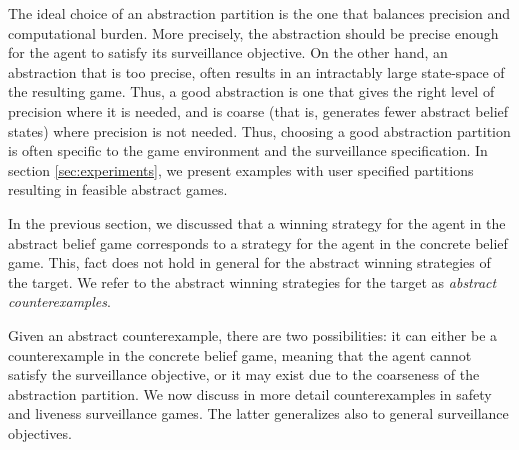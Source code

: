 The ideal choice of an abstraction partition is the one that balances precision and computational burden. More precisely, the abstraction should be precise enough for the agent to satisfy its surveillance objective. On the other hand, an abstraction that is too precise, often results in an intractably large state-space of the resulting game. Thus, a good abstraction is one that gives the right level of precision where it is needed, and is coarse (that is, generates fewer abstract belief states) where precision is not needed. Thus, choosing a good abstraction partition is often specific to the game environment and the surveillance specification. In section \ref{sec:experiments}, we present  examples with user specified partitions resulting in feasible  abstract games.

In the previous section, we discussed that a winning strategy for the agent in the abstract belief game corresponds to a strategy for the agent in the concrete belief game. This, fact does not hold in general for the abstract winning strategies of the target. We refer to the abstract winning  strategies for the target as \emph{abstract counterexamples}.

Given an abstract counterexample, there are two possibilities: it can either be a counterexample in the concrete belief game, meaning that the agent cannot satisfy the surveillance objective, or it may exist due to the coarseness of the abstraction partition. We now discuss in more detail counterexamples in safety and liveness surveillance games. The latter generalizes also to general surveillance objectives.
